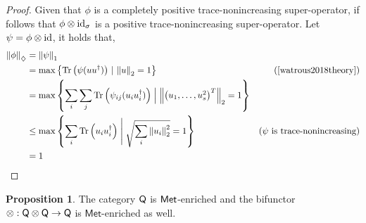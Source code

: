 \documentclass[10pt,a4paper]{amsart}
\theoremstyle{definition}
\theoremstyle{definition}
\theoremstyle{definition}
\theoremstyle{definition}
\newtheorem{proposition}[definition]{Proposition}
\theoremstyle{definition}
\theoremstyle{definition}
\begin{document}
  \begin{proof}
    Given that $\phi$ is a  completely positive trace-nonincreasing super-operator, if follows that $ \phi \otimes \mathrm{id}_{\sigma}$ is a positive trace-nonincreasing super-operator. Let $\psi = \phi \otimes \mathrm{id}$, it holds that,
    \begin{align*}
      \diamondnorm{\phi}& =\tracenorm{\psi}\\
       &= \max \left\{\tr \left( \psi (u u^\dag)\right) \, \vert \, \euclideannorm{u}=1 \right\}  & \left(\text{\cite[Theorem 3.39]{watrous2018theory}}\right)\\
      & = \max \left\{ \sum_i \sum_j \tr \left( \psi_{ij} (u_i u_i^\dag)\right) \Bigm|  \euclideannorm{\begin{pmatrix} u_1, \ldots, u_s^2 \end{pmatrix}^T}=1 \right\} \\
      & \leq \max \left\{ \sum_i \tr \left( u_i u_i^\dag \right) \Biggm| \sqrt{\sum_i \euclideannorm{u_i}^2}=1 \right\}   & (\psi \text{ is trace-nonincreasing}) \\
      & = 1
    \end{align*}
    
    
    
  \end{proof}

  

\begin{proposition}
  The category $\mathsf{Q}$ is $\mathsf{Met}$-enriched and the bifunctor $\otimes : \mathsf{Q} \otimes \mathsf{Q} \to \mathsf{Q}$ is $\mathsf{Met}$-enriched as well.
\end{proposition}
\end{document}
